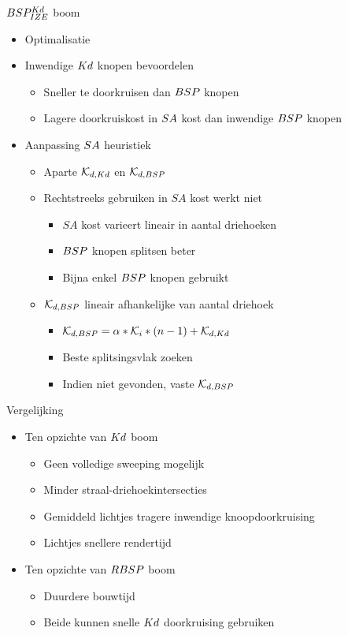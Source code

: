 \documentclass[11pt,t]{beamer}
\begin{document}
\begin{frame}{$BSP^{Kd}_{IZE}$ boom}
	\begin{itemize}
	\item Optimalisatie
	\pause
	\item Inwendige $Kd$ knopen bevoordelen
		\begin{itemize}
			\item Sneller te doorkruisen dan $BSP$ knopen
			\item Lagere doorkruiskost in $SA$ kost dan inwendige $BSP$ knopen
		\end{itemize}
	\pause
	\item Aanpassing $SA$ heuristiek
		\begin{itemize}
			\item Aparte $\mathcal{K}_{d,Kd}$ en $\mathcal{K}_{d,BSP}$
			\pause
			\item Rechtstreeks gebruiken in $SA$ kost werkt niet
			\begin{itemize}
				\item $SA$ kost varieert lineair in aantal driehoeken
				\item $BSP$ knopen splitsen beter
				\item Bijna enkel $BSP$ knopen gebruikt
			\end{itemize}
			\pause
			\item $\mathcal{K}_{d,BSP}$ lineair afhankelijke van aantal driehoek
			\begin{itemize}
				\item $\mathcal{K}_{d,BSP} = \alpha * \mathcal{K}_i * (n - 1) + \mathcal{K}_{d,Kd}$
				\item Beste splitsingsvlak zoeken
				\item Indien niet gevonden, vaste $\mathcal{K}_{d,BSP}$
			\end{itemize}
		\end{itemize}
	\end{itemize}
\end{frame}

\begin{frame}{Vergelijking}
	\begin{itemize}
	\item Ten opzichte van $Kd$ boom
		\begin{itemize}
			\item Geen volledige sweeping mogelijk
			\item Minder straal-driehoekintersecties
			\item Gemiddeld lichtjes tragere inwendige knoopdoorkruising
			\item Lichtjes snellere rendertijd
		\end{itemize}
	\pause
	\item Ten opzichte van $RBSP$ boom
		\begin{itemize}
			\item Duurdere bouwtijd
			\item Beide kunnen snelle $Kd$ doorkruising gebruiken
		\end{itemize}
	\end{itemize}
\end{frame}
\end{document}
